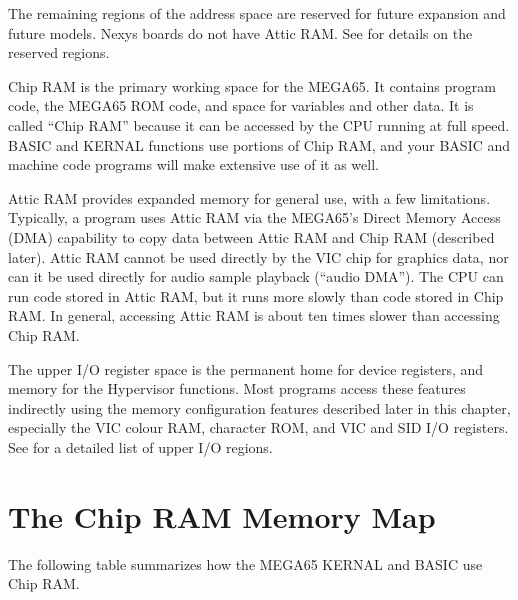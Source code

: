 The remaining regions of the address space are reserved for future expansion
and future models. Nexys boards do not have Attic RAM. See
 for details on the reserved regions.

Chip RAM is the primary working space for the MEGA65. It contains program code,
the MEGA65 ROM code, and space for variables and other data. It is called ``Chip
RAM'' because it can be accessed by the CPU running at full speed. BASIC and
KERNAL functions use portions of Chip RAM, and your BASIC and machine code
programs will make extensive use of it as well.

Attic RAM provides expanded memory for general use, with a few limitations.
Typically, a program uses Attic RAM via the MEGA65's Direct Memory Access (DMA) capability to
copy data between Attic RAM and Chip RAM (described later). Attic RAM cannot be used directly by the VIC
chip for graphics data, nor can it be used directly for audio sample playback
(``audio DMA''). The CPU can run code stored in Attic RAM, but it runs more
slowly than code stored in Chip RAM. In general, accessing Attic RAM is about
ten times slower than accessing Chip RAM.

The upper I/O register space is the permanent home for device registers, and
memory for the Hypervisor functions. Most programs access these features
indirectly using the memory configuration features described later in this
chapter, especially the VIC colour RAM, character ROM, and VIC and SID I/O
registers. See  for a detailed list of upper I/O regions.


\newpage
\section{The Chip RAM Memory Map}

The following table summarizes how the MEGA65 KERNAL and BASIC use Chip RAM.

